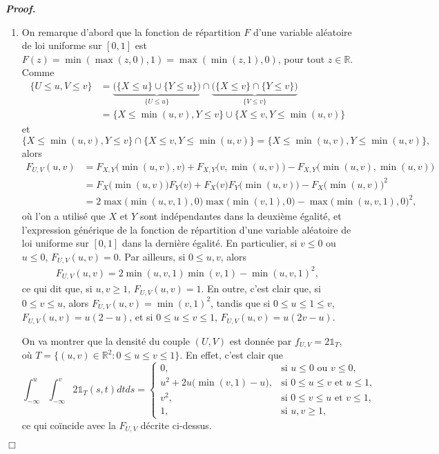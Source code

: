 \documentclass[11pt,a4paper]{article}
\newcommand{\RR}{\mathbb{R}}
\newenvironment{preuve}[1][]
{\vskip 2mm  \noindent\emph{\bf Proof#1. }}{$\Box$ \vskip 2mm}
\let\geq\geqslant
\let\leq\leqslant
\begin{document}
		\begin{preuve}
			\begin{enumerate}
				\item On remarque d'abord que la fonction de répartition $F$ d'une variable aléatoire de loi uniforme sur $[0,1]$ est 
				$F(z) = \min(\max(z,0),1) = \max(\min(z,1),0)$, pour tout $z \in \RR$. 
				Comme 
				\begin{align*}
				\{ U \leq u, V \leq v\} &= \underset{\{ U \leq u \}}{\underbrace{\big(\{ X \leq u \} \cup \{ Y \leq u \}\big)}} \cap \underset{\{ V \leq v \}}{\underbrace{\big(\{ X \leq v \} \cap \{ Y \leq v \}\big)}} 
				\\
				&= \big\{ X \leq \min(u,v), Y \leq v \big\} \cup \big\{ X \leq v, Y \leq \min(u,v) \big\}    
				\end{align*}
				et 
				\[     \big\{ X \leq \min(u,v), Y \leq v \big\} \cap \big\{ X \leq v, Y \leq \min(u,v) \big\} = \big\{ X \leq \min(u,v), Y \leq \min(u,v) \big\},     \]
				alors 
				\begin{align*}
				F_{U,V}(u,v) &= F_{X,Y}\big(\min(u,v), v\big) + F_{X,Y}\big(v,\min(u,v)\big) - F_{X,Y}\big(\min(u,v), \min(u,v)\big) 
				\\
				&= F_{X}\big(\min(u,v)\big) F_{Y}\big(v\big) + F_{X}\big(v\big) F_{Y}\big(\min(u,v)\big) - F_{X}\big(\min(u,v)\big)^{2}
				\\
				&= 2 \max\big(\min(u,v,1),0\big) \max\big(\min(v,1),0\big) -  \max\big(\min(u,v,1),0\big)^{2},  
				\end{align*}
				où l'on a utilisé que $X$ et $Y$ sont indépendantes dans la deuxième égalité, et l'expression générique de la fonction de répartition d'une variable aléatoire de loi uniforme sur $[0,1]$ dans la dernière égalité. 
				En particulier, si $v \leq 0$ ou $u \leq 0$, $F_{U,V}(u,v) = 0$. 
				Par ailleurs, si $0\leq u, v$, alors 
				\begin{align*}
				F_{U,V}(u,v) = 2 \min(u,v,1) \min(v,1) -  \min(u,v,1)^{2},  
				\end{align*}
				ce qui dit que, si $u,v \geq 1$, $F_{U,V}(u,v) = 1$. 
				En outre, c'est clair que, si $0\leq v\leq u$, alors $F_{U,V}(u,v) = \min(v,1)^{2}$, tandis que 
				si $0\leq u \leq 1 \leq v$, $F_{U,V}(u,v) = u (2-u)$, et si $0\leq u\leq v \leq 1$, $F_{U,V}(u,v) = u (2v-u)$. 
				
				On va montrer que la densité du couple $(U,V)$ est donnée par $f_{U,V}=2 \mathbb{1}_T$, où  $T= \{(u,v)\in \RR^{2} : 0\leq u\leq v\leq 1\}$. 
				En effet, c'est clair que 
				\[     \int_{- \infty}^{u} \int_{- \infty}^{v} 2 \mathbb{1}_T(s,t) dt ds = \begin{cases}
				0, &\text{si $u \leq 0$ ou $v \leq 0$},
				\\
				u^{2} + 2 u \big(\min(v,1)-u\big), &\text{si $0 \leq u \leq v$ et $u \leq 1$},
				\\
				v^{2}, &\text{si $0 \leq v \leq u$ et $v \leq 1$},
				\\
				1, &\text{si $u, v \geq 1$},
				\end{cases} 
				\]
				ce qui coïncide avec la $F_{U,V}$ décrite ci-dessus. 
				

\end{enumerate}
\end{preuve}
\end{document}
